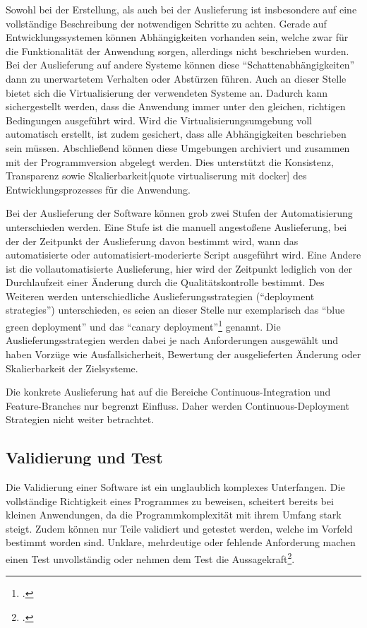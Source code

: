 Sowohl bei der Erstellung, als auch bei der Auslieferung ist insbesondere auf eine vollständige Beschreibung der 
notwendigen Schritte zu achten. Gerade auf Entwicklungssystemen können Abhängigkeiten vorhanden sein, welche zwar für die 
Funktionalität der Anwendung sorgen, allerdings nicht beschrieben wurden. Bei der Auslieferung auf andere Systeme können 
diese ``Schattenabhängigkeiten'' dann zu unerwartetem Verhalten oder Abstürzen führen. 
Auch an dieser Stelle bietet sich die Virtualisierung der verwendeten Systeme an. Dadurch kann sichergestellt werden, 
dass die Anwendung immer unter den gleichen, richtigen Bedingungen ausgeführt wird. Wird die Virtualisierungsumgebung 
voll automatisch erstellt, ist zudem gesichert, dass alle Abhängigkeiten beschrieben sein müssen.
Abschließend können diese Umgebungen archiviert und zusammen mit der Programmversion abgelegt werden. Dies unterstützt 
die Konsistenz, Transparenz sowie Skalierbarkeit[quote virtualiserung mit docker] des Entwicklungsprozesses für die 
Anwendung.

Bei der Auslieferung der Software können grob zwei Stufen der Automatisierung unterschieden werden. Eine Stufe ist die 
manuell angestoßene Auslieferung, bei der der Zeitpunkt der Auslieferung davon bestimmt wird, wann das automatisierte 
oder automatisiert-moderierte Script ausgeführt wird. Eine Andere ist die vollautomatisierte Auslieferung, hier wird der 
Zeitpunkt lediglich von der Durchlaufzeit einer Änderung durch die Qualitätskontrolle bestimmt.
Des Weiteren werden unterschiedliche Auslieferungsstrategien (``deployment strategies'') unterschieden, es seien an 
dieser Stelle nur exemplarisch das ``blue green deployment'' und das ``canary deployment''\footcite[261-264 Deploying and Releasing Applications][]
{humble2010} genannt. Die Auslieferungsstrategien werden dabei je nach Anforderungen ausgewählt und haben Vorzüge wie 
Ausfallsicherheit, Bewertung der ausgelieferten Änderung oder Skalierbarkeit der Zielsysteme.

Die konkrete Auslieferung hat auf die Bereiche Continuous-Integration und Feature-Branches nur begrenzt Einfluss. Daher 
werden Continuous-Deployment Strategien nicht weiter betrachtet.

\subsection{Validierung und Test}

Die Validierung einer Software ist ein unglaublich komplexes Unterfangen. Die vollständige Richtigkeit eines Programmes 
zu beweisen, scheitert bereits bei kleinen Anwendungen, da die Programmkomplexität mit ihrem Umfang stark steigt. Zudem 
können nur Teile validiert und getestet werden, welche im Vorfeld bestimmt worden sind. Unklare, mehrdeutige oder 
fehlende Anforderung machen einen Test unvollständig oder nehmen dem Test die Aussagekraft\footcite[S. 243 Kapitel 4.6][]{software-quality2008}.

